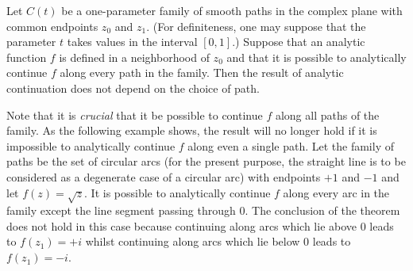\documentclass[12pt]{article}
\begin{document}
Let $C(t)$ be a one-parameter family of smooth paths in the complex plane with common endpoints $z_0$ and $z_1$. (For definiteness, one may suppose that the parameter $t$ takes values in the interval $[0,1]$.)  Suppose that an analytic function $f$ is defined in a neighborhood of $z_0$ and that it is possible to analytically continue $f$ along every path in the family.  Then the result of analytic continuation does not depend on the choice of path.

Note that it is \emph{crucial} that it be possible to continue $f$ along all paths of the family.  As the following example shows, the result will no longer hold if it is impossible to analytically continue $f$ along even a single path.   Let the family of paths be the set of circular arcs (for the present purpose, the straight line is to be considered as a degenerate case of a circular arc) with endpoints $+1$ and $-1$ and let $f(z) = \sqrt{z}$.  It is possible to analytically continue $f$ along every arc in the family except the line segment passing through $0$.  The conclusion of the theorem does not hold in this case because continuing along arcs which lie above $0$ leads to $f(z_1) = +i$ whilst continuing along arcs which lie below $0$ leads to $f(z_1) = -i$.
\end{document}
